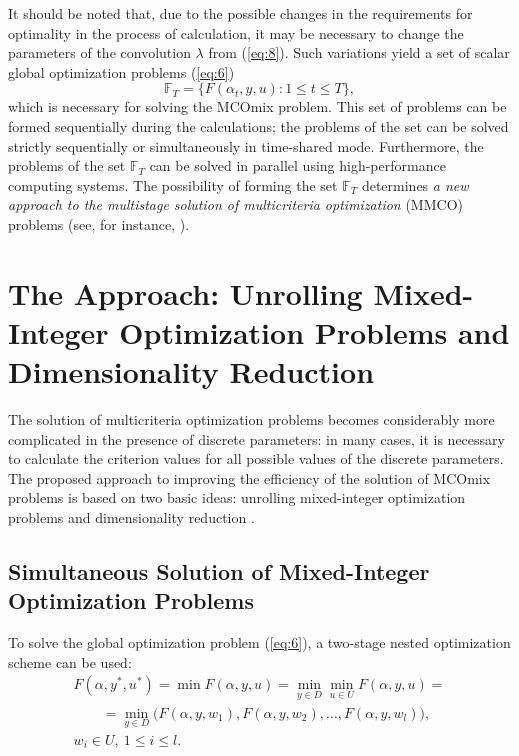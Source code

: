 \documentclass{svproc}
\begin{document}
It should be noted that, due to the possible changes in the requirements for optimality in the process of calculation, it may be necessary to change the parameters of the convolution $\lambda$ from (\ref{eq:8}). Such variations yield a set of scalar global optimization problems (\ref{eq:6})
\begin{equation}\label{eq:10}
\mathbb{F}_T=\{F(\alpha_t,y , u):1 \leq t \leq T\},
\end{equation}
which is necessary for solving the MCOmix problem. This set of problems can be formed sequentially during the calculations; the problems of the set can be solved strictly sequentially or simultaneously in time-shared mode. Furthermore, the problems of the set $\mathbb{F}_T$ can be solved in parallel using high-performance computing systems. The possibility of forming the set $\mathbb{F}_T$ determines \textit{a new approach to the multistage solution of multicriteria optimization} (MMCO) problems (see, for instance, \cite{c22}).

\section{The Approach: Unrolling Mixed-Integer Optimization Problems and Dimensionality Reduction}\label{sec:3}

The solution of multicriteria optimization  problems becomes considerably  more complicated in the presence of discrete parameters: in many cases, it is necessary to calculate the criterion values for all possible values of the discrete parameters. The proposed approach to improving the efficiency of the solution of MCOmix problems is based on two basic ideas: unrolling mixed-integer optimization problems \cite{c23} and dimensionality reduction \cite{c24,c25}.

\subsection{Simultaneous Solution of Mixed-Integer Optimization Problems} \label{subsec:31}

To solve the global optimization problem (\ref{eq:6}), a two-stage nested optimization scheme can be used:
\begin{equation}\label{eq:11}
\begin{gathered}
  F(\alpha,y^*,u^*)=\min{F(\alpha,y,u)} = \min_{y \in D} \min_{u \in U}{F(\alpha,y,u)} = \\
  \qquad=\min_{y \in D}\bigl(F(\alpha,y,w_1 ),F(\alpha,y,w_2 ), \dots, F(\alpha,y,w_l )\bigr),\\
	w_i\in U,\ 1 \leq i \leq l.
\end{gathered}
\end{equation}
\end{document}
